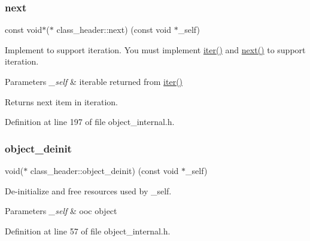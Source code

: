 \mbox{\label{structclass__header_a34b23ea4b047e4526bfb743d5be3e69c}} 
\subsubsection{\texorpdfstring{next}{next}}
{\footnotesize\ttfamily const void$\ast$($\ast$ class\+\_\+header\+::next) (const void $\ast$\+\_\+self)}

Implement to support iteration. You must implement \mbox{\hyperlink{structclass__header_ab45bdc16b08b8cde751d161dd0c4f230}{iter()}} and \mbox{\hyperlink{structclass__header_a34b23ea4b047e4526bfb743d5be3e69c}{next()}} to support iteration.


\begin{DoxyParams}{Parameters}
{\em \+\_\+self} & iterable returned from \mbox{\hyperlink{structclass__header_ab45bdc16b08b8cde751d161dd0c4f230}{iter()}} \\
\hline
\end{DoxyParams}
\begin{DoxyReturn}{Returns}
next item in iteration. 
\end{DoxyReturn}


Definition at line 197 of file object\+\_\+internal.\+h.

\mbox{\label{structclass__header_aa07a11a17f5d79a66c9086b8d10969b7}} 
\subsubsection{\texorpdfstring{object\+\_\+deinit}{object\_deinit}}
{\footnotesize\ttfamily void($\ast$ class\+\_\+header\+::object\+\_\+deinit) (const void $\ast$\+\_\+self)}

De-\/initialize and free resources used by \+\_\+self.


\begin{DoxyParams}{Parameters}
{\em \+\_\+self} & ooc object \\
\hline
\end{DoxyParams}


Definition at line 57 of file object\+\_\+internal.\+h.



